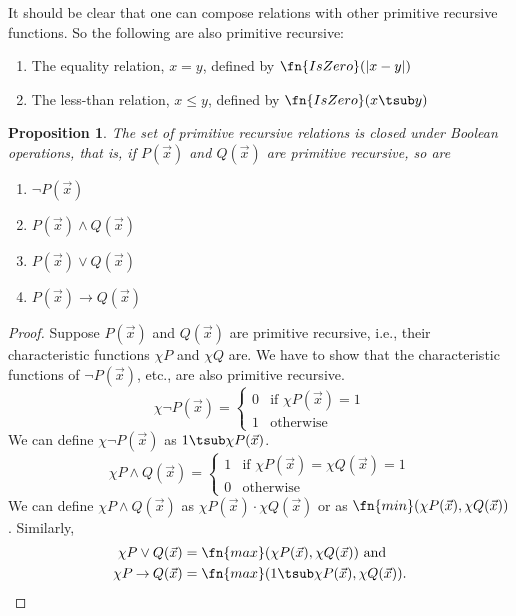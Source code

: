 \documentclass[10pt,a4paper]{article}
\theoremstyle{plain}
\newtheorem{prop}[thm]{Proposition}
\theoremstyle{definition}
\theoremstyle{remark}
\providecommand{\lif}{\mathbin{\rightarrow}}
\providecommand{\Char}{\chi}
\begin{document}
It should be clear that one can compose relations with other primitive
recursive functions. So the following are also primitive recursive:
\begin{enumerate}
\item The equality relation, $x = y$, defined by $\fn{IsZero}(\left|x -
  y\right|)$
\item The less-than relation, $x \leq y$, defined by $\fn{IsZero}(x
  \tsub y)$
\end{enumerate}


\begin{prop}
  The set of primitive recursive relations is closed under Boolean
  operations, that is, 
  if $P(\vec x)$ and $Q(\vec x)$ are primitive recursive, so are
  \begin{enumerate}
  \item $\lnot P(\vec x)$
  \item $P(\vec x) \land Q(\vec x)$
  \item $P(\vec x) \lor Q(\vec x)$
  \item $P(\vec x) \lif Q(\vec x)$
  \end{enumerate}
\end{prop}

\begin{proof}
  Suppose $P(\vec x)$ and $Q(\vec x)$ are primitive recursive, i.e.,
  their characteristic functions $\Char{P}$ and $\Char{Q}$ are.  We
  have to show that the characteristic functions of $\lnot P(\vec x)$,
  etc., are also primitive recursive.
  \[
  \Char{\lnot P}(\vec x) = \begin{cases}
    0 & \text{if $\Char{P}(\vec x) = 1$}\\
    1 & \text{otherwise}
  \end{cases}
  \]
  We can define $\Char{\lnot P}(\vec x)$ as $1 \tsub \Char{P}(\vec x)$.
  \[
  \Char{P \land Q}(\vec x) = \begin{cases}
    1 & \text{if $\Char{P}(\vec x) = \Char{Q}(\vec x) = 1$}\\
    0 & \text{otherwise}
  \end{cases}
  \]
  We can define $\Char{P \land Q}(\vec x)$ as $\Char{P}(\vec x) \cdot
  \Char{Q}(\vec x)$ or as $\fn{min}(\Char{P}(\vec x), \Char{Q}(\vec
  x))$. Similarly, 
  \begin{align*}
    \Char{P \lor Q}(\vec x) & = \fn{max}(\Char{P}(\vec x), \Char{Q}(\vec x)) \text{ and}\\
    \Char{P \lif Q}(\vec x) & = \fn{max}(1 \tsub
  \Char{P}(\vec x), \Char{Q}(\vec x)).
  \end{align*}
\end{proof}
\end{document}
